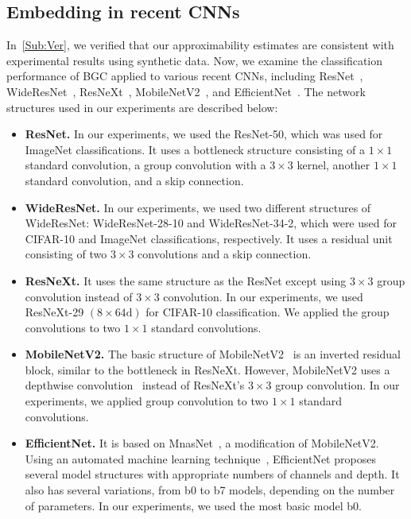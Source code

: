 \documentclass[preprint,12pt,authoryear]{elsarticle}
\numberwithin{equation}{section}
\theoremstyle{remark}
\begin{document}
\subsection{Embedding in recent CNNs}
In~\cref{Sub:Ver}, we verified that our approximability estimates are consistent with experimental results using synthetic data.
Now, we examine the classification performance of BGC applied to various recent CNNs, including ResNet~\citep{he2016deep}, WideResNet~\citep{zagoruyko2016wide}, ResNeXt~\citep{xie2017aggregated}, MobileNetV2~\citep{sandler2018mobilenetv2}, and EfficientNet~\citep{tan2019efficientnet}.
The network structures used in our experiments are described below:
\begin{itemize}
  \item \textbf{ResNet.} In our experiments, we used the ResNet-50, which was used for ImageNet classifications.
  It uses a bottleneck structure consisting of a $1 \times 1$ standard convolution, a group convolution with a $3 \times 3$ kernel, another $1 \times 1$ standard convolution, and a skip connection.
  \item \textbf{WideResNet.} In our experiments, we used two different structures of WideResNet: WideResNet-28-10 and WideResNet-34-2, which were used for CIFAR-10 and ImageNet classifications, respectively.
  It uses a residual unit consisting of two $3 \times 3$ convolutions and a skip connection.
  \item \textbf{ResNeXt.} It uses the same structure as the ResNet except using $3 \times 3$ group convolution instead of $3 \times 3$ convolution. In our experiments, we used ResNeXt-29 $(8 \times 64\text{d})$ for CIFAR-10 classification. We applied the group convolutions to two $1 \times 1$ standard convolutions.
  \item \textbf{MobileNetV2.} The basic structure of MobileNetV2~\citep{sandler2018mobilenetv2} is an inverted residual block, similar to the bottleneck in ResNeXt. However, MobileNetV2 uses a depthwise convolution~\citep{chollet2017xception} instead of ResNeXt's $3 \times 3$ group convolution. In our experiments, we applied group convolution to two $1 \times 1$ standard convolutions.
  \item \textbf{EfficientNet.} It is based on MnasNet~\citep{tan2019mnasnet}, a modification of MobileNetV2. Using an automated machine learning technique~\citep{zophneural2016}, EfficientNet proposes several model structures with appropriate numbers of channels and depth. It also has several variations, from b0 to b7 models, depending on the number of parameters. In our experiments, we used the most basic model b0.
\end{itemize}
\end{document}

